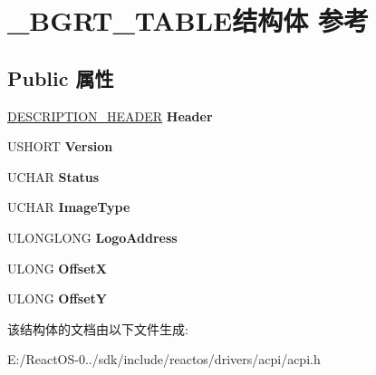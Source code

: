 \hypertarget{struct___b_g_r_t___t_a_b_l_e}{}\section{\+\_\+\+B\+G\+R\+T\+\_\+\+T\+A\+B\+L\+E结构体 参考}
\label{struct___b_g_r_t___t_a_b_l_e}
\subsection*{Public 属性}
\begin{DoxyCompactItemize}
\item 
\mbox{\label{struct___b_g_r_t___t_a_b_l_e_a555e534e0b6ae204ec773cb43ceae59f}} 
\hyperlink{struct___d_e_s_c_r_i_p_t_i_o_n___h_e_a_d_e_r}{D\+E\+S\+C\+R\+I\+P\+T\+I\+O\+N\+\_\+\+H\+E\+A\+D\+ER} {\bfseries Header}
\item 
\mbox{\label{struct___b_g_r_t___t_a_b_l_e_a83c68192d2a5dca659e619a3ea932c0a}} 
U\+S\+H\+O\+RT {\bfseries Version}
\item 
\mbox{\label{struct___b_g_r_t___t_a_b_l_e_ab75318fa79cad7b3b5ac5f9a15f8c535}} 
U\+C\+H\+AR {\bfseries Status}
\item 
\mbox{\label{struct___b_g_r_t___t_a_b_l_e_a4f4179d8b67177c39c0397297955e8b1}} 
U\+C\+H\+AR {\bfseries Image\+Type}
\item 
\mbox{\label{struct___b_g_r_t___t_a_b_l_e_a91221ea976ac19e0695b5216c82648c6}} 
U\+L\+O\+N\+G\+L\+O\+NG {\bfseries Logo\+Address}
\item 
\mbox{\label{struct___b_g_r_t___t_a_b_l_e_a3e35fec1f5c8f25a7b1ec26662c6a9e6}} 
U\+L\+O\+NG {\bfseries OffsetX}
\item 
\mbox{\label{struct___b_g_r_t___t_a_b_l_e_af289259598e92d1a512328aa50c09e5d}} 
U\+L\+O\+NG {\bfseries OffsetY}
\end{DoxyCompactItemize}


该结构体的文档由以下文件生成\+:\begin{DoxyCompactItemize}
\item 
E\+:/\+React\+O\+S-\/0../sdk/include/reactos/drivers/acpi/acpi.\+h\end{DoxyCompactItemize}
